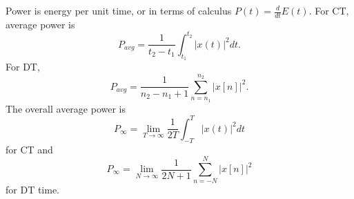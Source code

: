 Power is energy per unit time, or in terms of calculus $P(t) = \frac{d}{dt}E(t)$.
For CT, average power is
\begin{equation}
    P_{avg} = \frac{1}{t_2 - t_1} \int_{t_1}^{t_2} |x(t)|^2 dt.
\end{equation}
For DT,
\begin{equation}
    P_{avg} = \frac{1}{n_2 - n_1 + 1} \sum_{n=n_1}^{n_2} |x[n]|^2.
\end{equation}
The overall average power is
\begin{equation}
    P_{\infty} = \lim_{T \rightarrow \infty} \frac{1}{2T} \int_{-T}^{T} |x(t)|^2 dt
\end{equation}
for CT and
\begin{equation}
    P_{\infty} = \lim_{N \rightarrow \infty} \frac{1}{2N + 1} \sum_{n=-N}^{N} |x[n]|^2
\end{equation}
for DT time.